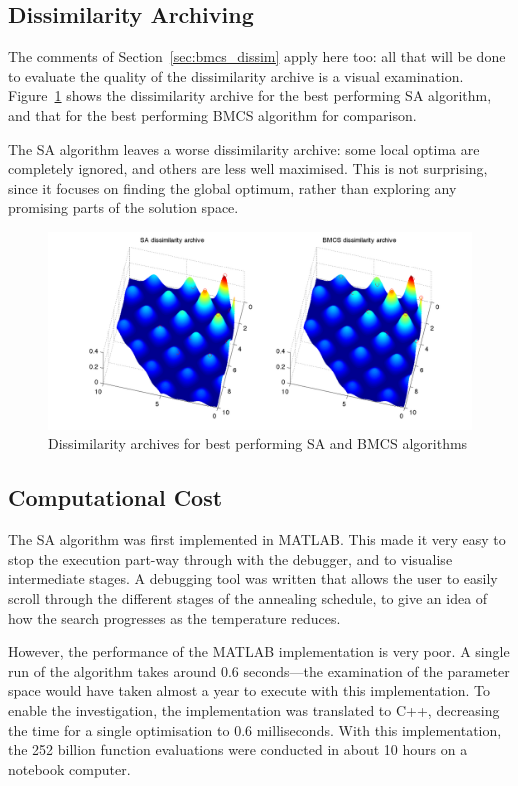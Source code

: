 \documentclass[10pt]{article}
\begin{document}
\subsection{Dissimilarity Archiving}

The comments of Section~\ref{sec:bmcs_dissim} apply here too: all that will be
done to evaluate the quality of the dissimilarity archive is a visual
examination. Figure~\ref{fig:sa_bmcs_dissim} shows the dissimilarity archive
for the best performing SA algorithm, and that for the best performing BMCS
algorithm for comparison.

The SA algorithm leaves a worse dissimilarity archive: some local optima are
completely ignored, and others are less well maximised. This is not
surprising, since it focuses on finding the global optimum, rather than
exploring any promising parts of the solution space.

\begin{figure}
  \begin{center}
    \includegraphics[width=15cm]{sa_bmcs_dissim.pdf}
    \end{center}
    \caption{Dissimilarity archives for best performing SA and BMCS algorithms}
    \label{fig:sa_bmcs_dissim}
    \end{figure}

\subsection{Computational Cost}

The SA algorithm was first implemented in MATLAB. This made it very easy to
stop the execution part-way through with the debugger, and to visualise
intermediate stages. A debugging tool was written that allows the user to
easily scroll through the different stages of the annealing schedule, to give
an idea of how the search progresses as the temperature reduces.

However, the performance of the MATLAB implementation is very poor. A single
run of the algorithm takes around 0.6 seconds---the examination of the
parameter space would have taken almost a year to execute with this
implementation. To enable the investigation, the implementation was translated
to C++, decreasing the time for a single optimisation to 0.6 milliseconds.
With this implementation, the 252 billion function evaluations were conducted
in about 10 hours on a notebook computer.
\end{document}
